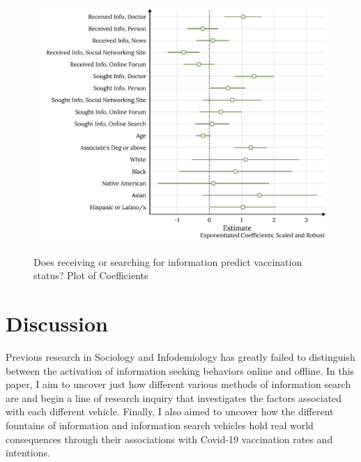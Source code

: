 
\begin{figure}[h]
{\centering \includegraphics[width=0.8\linewidth]{figs/paper2/plot-model-3-1}}
\caption{Does receiving or searching for information predict vaccination status? Plot of Coefficients}\label{fig:plot-model-3}
\end{figure}

\hypertarget{discussion}{%
\section{Discussion}\label{discussion}}

Previous research in Sociology and Infodemiology has greatly failed to
distinguish between the activation of information seeking behaviors online and
offline. In this paper, I aim to uncover just how different various methods of
information search are and begin a line of research inquiry that investigates
the factors associated with each different vehicle. Finally, I also aimed to
uncover how the different fountains of information and information search
vehicles hold real world consequences through their associations with Covid-19
vaccination rates and intentions.

